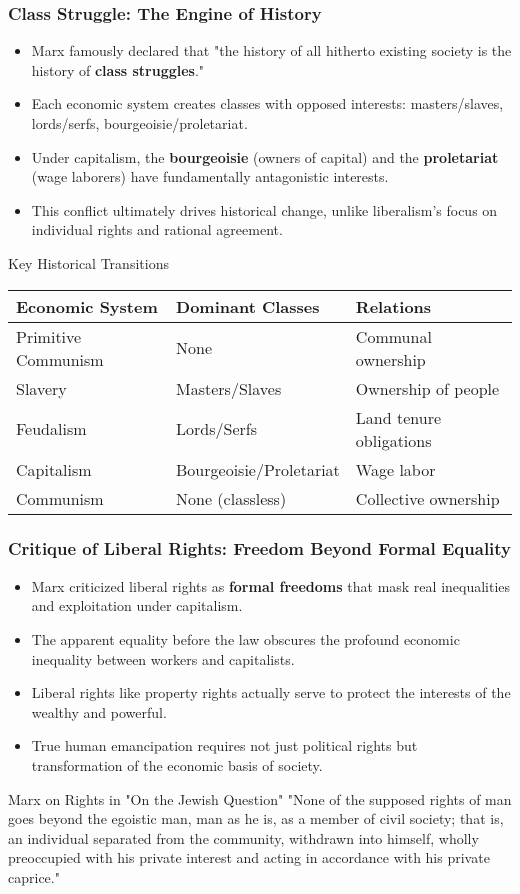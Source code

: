 \documentclass{beamer}
\begin{document}
\begin{frame}
\frametitle{Class Struggle: The Engine of History}
\begin{itemize}
    \item Marx famously declared that "the history of all hitherto existing society is the history of \textbf{class struggles}."
    \item Each economic system creates classes with opposed interests: masters/slaves, lords/serfs, bourgeoisie/proletariat.
    \item Under capitalism, the \textbf{bourgeoisie} (owners of capital) and the \textbf{proletariat} (wage laborers) have fundamentally antagonistic interests.
    \item This conflict ultimately drives historical change, unlike liberalism's focus on individual rights and rational agreement.
\end{itemize}

\begin{alertblock}{Key Historical Transitions}
\begin{tabular}{lll}
\textbf{Economic System} & \textbf{Dominant Classes} & \textbf{Relations} \\
\hline
Primitive Communism & None & Communal ownership \\
Slavery & Masters/Slaves & Ownership of people \\
Feudalism & Lords/Serfs & Land tenure obligations \\
Capitalism & Bourgeoisie/Proletariat & Wage labor \\
Communism & None (classless) & Collective ownership \\
\end{tabular}
\end{alertblock}
\end{frame}

\begin{frame}
\frametitle{Critique of Liberal Rights: Freedom Beyond Formal Equality}
\begin{itemize}
    \item Marx criticized liberal rights as \textbf{formal freedoms} that mask real inequalities and exploitation under capitalism.
    \item The apparent equality before the law obscures the profound economic inequality between workers and capitalists.
    \item Liberal rights like property rights actually serve to protect the interests of the wealthy and powerful.
    \item True human emancipation requires not just political rights but transformation of the economic basis of society.
\end{itemize}

\begin{exampleblock}{Marx on Rights in "On the Jewish Question"}
"None of the supposed rights of man goes beyond the egoistic man, man as he is, as a member of civil society; that is, an individual separated from the community, withdrawn into himself, wholly preoccupied with his private interest and acting in accordance with his private caprice."
\end{exampleblock}
\end{frame}
\end{document}

